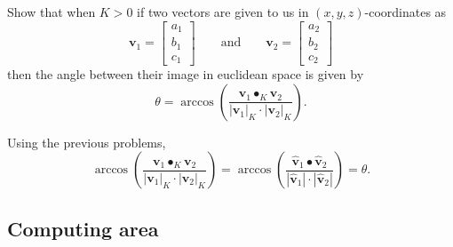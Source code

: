 \documentclass[newpage,hints,handout,12pt,noauthor,nooutcomes]{ximera}
\begin{document}
\begin{problem}
  Show that when $K>0$ if two vectors are given to us in $(x,y,z)$-coordinates as
  \[
  \mathbf{v}_{1}=\begin{bmatrix}a_{1} \\ b_{1} \\ c_{1}\end{bmatrix}
  \qquad\text{and}\qquad
  \mathbf{v}_{2} =\begin{bmatrix}a_{2} \\ b_{2} \\ c_{2}\end{bmatrix}
  \]
  then the angle between their image in euclidean space is given by
  \[
  \theta = \arccos\left(\frac{\mathbf{v}_1\bullet_K \mathbf{v}_2}{|\mathbf{v}_1|_K \cdot|\mathbf{v}_2|_K }\right).
  \]


\begin{freeResponse} Using the previous problems,
\[
\arccos\left(\frac{\mathbf{v}_1\bullet_K \mathbf{v}_2}{\left| \mathbf{v}_1\right|_K \cdot\left|\mathbf{v}_2\right|_K }\right) = \arccos\left(\frac{\hat{\mathbf v}_{1}\bullet \hat{\mathbf v}_{2}}{\left| \hat{\mathbf v}_{1}\right| \cdot\left|\hat{\mathbf v}_{2}\right| }\right) = \theta.
\]
\end{freeResponse}
\end{problem}




\subsection{Computing area}
\end{document}
